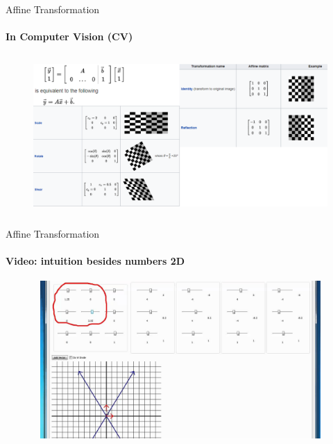 \documentclass[aspectratio=169]{beamer}
\begin{document}
\begin{frame}[t]{Affine Transformation}
\framesubtitle{In Computer Vision (CV)}
    \vspace{-0.6cm}
    \begin{figure}[H]
        \centering\includegraphics[height=6cm,width=1\textwidth,keepaspectratio]{affine_cv.png}
        \label{fig:affine_cv.png}
    \end{figure}
\end{frame}

\begin{frame}[t]{Affine Transformation}
    \framesubtitle{Video: intuition besides numbers 2D}
    \vspace{-0.6cm}
    \begin{figure}[H]
        \href{https://youtu.be/Y_TKQKdWC2k}{
            \centering\includegraphics[height=6cm,width=1\textwidth,keepaspectratio]{num_intuition.jpg}}
        \label{fig:num_intuition.jpg}
    \end{figure}
\end{frame}
\end{document}
